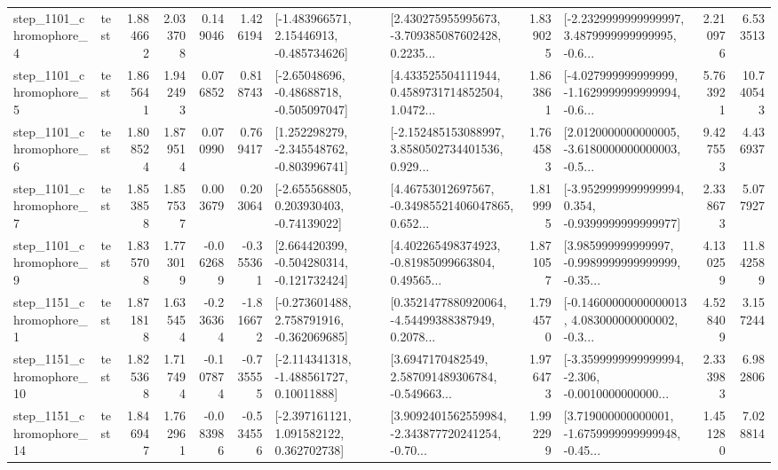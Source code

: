 \begin{tabular}{llrrrrllrlrr}
  step\_1101\_chromophore\_4 &      test &      1.884662 &    2.033708 &      0.149046 &  1.426194 &    [-1.483966571, 2.15446913, -0.485734626] &  [2.430275955995673, -3.709385087602428, 0.2235... &       1.839025 &  [-2.2329999999999997, 3.4879999999999995, -0.6... &            2.210976 &          6.533513 \\
  step\_1101\_chromophore\_5 &      test &      1.865641 &    1.942493 &      0.076852 &  0.818743 &    [-2.65048696, -0.48688718, -0.505097047] &  [4.433525504111944, 0.4589731714852504, 1.0472... &       1.863861 &  [-4.027999999999999, -1.1629999999999994, -0.6... &            5.763921 &         10.740543 \\
  step\_1101\_chromophore\_6 &      test &      1.808524 &    1.879514 &      0.070990 &  0.769417 &   [1.252298279, -2.345548762, -0.803996741] &  [-2.152485153088997, 3.8580502734401536, 0.929... &       1.764583 &  [2.0120000000000005, -3.6180000000000003, -0.5... &            9.427553 &          4.436937 \\
  step\_1101\_chromophore\_7 &      test &      1.853858 &    1.857537 &      0.003679 &  0.203064 &    [-2.655568805, 0.203930403, -0.74139022] &  [4.46753012697567, -0.34985521406047865, 0.652... &       1.819995 &  [-3.9529999999999994, 0.354, -0.9399999999999977] &            2.338673 &          5.077927 \\
  step\_1101\_chromophore\_9 &      test &      1.835708 &    1.773019 &     -0.062689 & -0.355361 &   [2.664420399, -0.504280314, -0.121732424] &  [4.402265498374923, -0.81985099663804, 0.49565... &       1.871057 &  [3.985999999999997, -0.9989999999999999, -0.35... &            4.130259 &         11.842589 \\
  step\_1151\_chromophore\_1 &      test &      1.871818 &    1.635454 &     -0.236364 & -1.816672 &   [-0.273601488, 2.758791916, -0.362069685] &  [0.3521477880920064, -4.54499388387949, 0.2078... &       1.794570 &  [-0.14600000000000013, 4.083000000000002, -0.3... &            4.528409 &          3.157244 \\
 step\_1151\_chromophore\_10 &      test &      1.825368 &    1.717494 &     -0.107874 & -0.735555 &    [-2.114341318, -1.488561727, 0.10011888] &  [3.6947170482549, 2.587091489306784, -0.549663... &       1.976473 &  [-3.3599999999999994, -2.306, -0.0010000000000... &            2.333983 &          6.982806 \\
 step\_1151\_chromophore\_14 &      test &      1.846947 &    1.762961 &     -0.083986 & -0.534556 &    [-2.397161121, 1.091582122, 0.362702738] &  [3.9092401562559984, -2.343877720241254, -0.70... &       1.992299 &  [3.719000000000001, -1.6759999999999948, -0.45... &            1.451280 &          7.028814 \\

\end{tabular}
